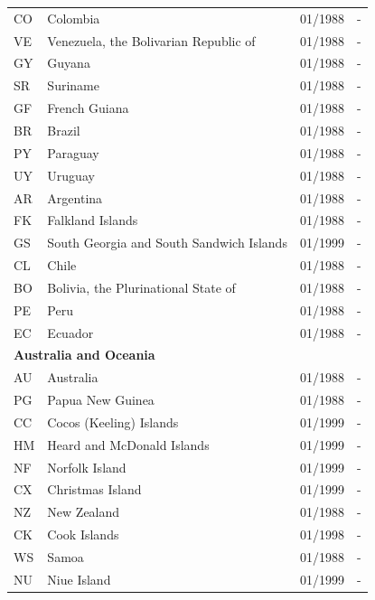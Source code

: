 \begin{scriptsize}
\begin{longtable}{lp{8.8cm}p{2cm}p{2cm}}
	CO & Colombia                                 & 01/1988 & -  \\
	VE & Venezuela, the Bolivarian Republic of    & 01/1988 & -  \\
	GY & Guyana                                   & 01/1988 & -  \\
	SR & Suriname                                 & 01/1988 & -  \\
	GF & French Guiana                            & 01/1988 & -  \\
	BR & Brazil                                   & 01/1988 & -  \\
	PY & Paraguay                                 & 01/1988 & -  \\
	UY & Uruguay                                  & 01/1988 & -  \\
	AR & Argentina                                & 01/1988 & -  \\
	FK & Falkland Islands                         & 01/1988 & -  \\
	GS & South Georgia and South Sandwich Islands & 01/1999 & -  \\
	CL & Chile                                    & 01/1988 & -  \\
	BO & Bolivia, the Plurinational State of      & 01/1988 & -  \\
	PE & Peru                                     & 01/1988 & -  \\
	EC & Ecuador                                  & 01/1988 & -  \\
	\midrule
	\multicolumn{3}{l}{\textbf{Australia and Oceania}}  &  \\
	AU & Australia                       & 01/1988 & -  \\
	PG & Papua New Guinea                & 01/1988 & -  \\
	CC & Cocos (Keeling) Islands         & 01/1999 & -  \\
	HM & Heard and McDonald Islands      & 01/1999 & -  \\
	NF & Norfolk Island                  & 01/1999 & -  \\
	CX & Christmas Island                & 01/1999 & -  \\
	NZ & New Zealand                     & 01/1988 & -  \\
	CK & Cook Islands                    & 01/1998 & -  \\
	WS & Samoa                           & 01/1988 & -  \\
	NU & Niue Island                     & 01/1999 & -  \\

\end{longtable}
\end{scriptsize}
